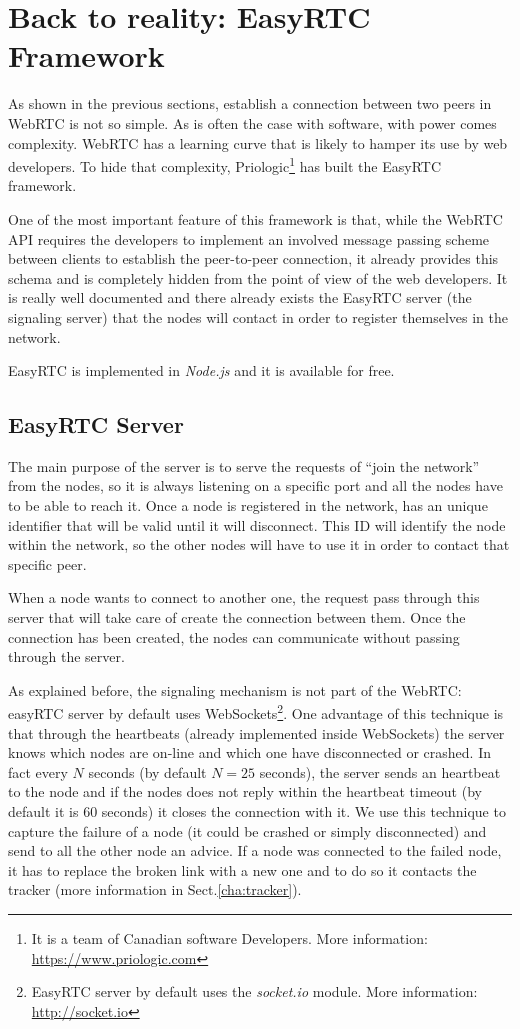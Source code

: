 \section{Back to reality: EasyRTC Framework}
\label{sec:easy_tc}
As shown in the previous sections, establish a connection between two peers in WebRTC is not so simple.
As is often the case with software, with power comes complexity. WebRTC has a learning curve that is likely to hamper its use by web developers. To hide that complexity, Priologic\footnote{It is a team of Canadian software Developers. More information: \url{https://www.priologic.com}} has built the EasyRTC framework.

One of the most important feature of this framework is that, while the WebRTC API requires the developers to implement an involved message passing scheme between clients to establish the peer-to-peer connection, it already provides this schema\cite{easyrtc} and is completely hidden from the point of view of the web developers. It is really well documented and there already exists the EasyRTC server (the signaling server) that the nodes will contact in order to register themselves in the network.

EasyRTC is implemented in \textit{Node.js} and it is available for free.

\subsection{EasyRTC Server}
\label{subsec:easyrtc_server}
The main purpose of the server is to serve the requests of ``join the network'' from the nodes, so it is always listening on a specific port and all the nodes have to be able to reach it. Once a node is registered in the network, has an unique identifier that will be valid until it will disconnect. This ID will identify the node within the network, so the other nodes will have to use it in order to contact that specific peer. 

When a node wants to connect to another one, the request pass through this server that will take care of create the connection between them. Once the connection has been created, the nodes can communicate without passing through the server. 

As explained before, the signaling mechanism is not part of the WebRTC: easyRTC server by default uses WebSockets\footnote{EasyRTC server by default uses the \emph{socket.io} module. More information: \url{http://socket.io}}. One advantage of this technique is that through the heartbeats (already implemented inside WebSockets) the server knows which nodes are on-line and which one have disconnected or crashed. In fact every $N$ seconds (by default $N = 25$ seconds), the server sends an heartbeat to the node and if the nodes does not reply within the heartbeat timeout (by default it is 60 seconds) it closes the connection with it. We use this technique to capture the failure of a node (it could be crashed or simply disconnected) and send to all the other node an advice. If a node was connected to the failed node, it has to replace the broken link with a new one and to do so it contacts the tracker (more information in Sect.\ref{cha:tracker}).

